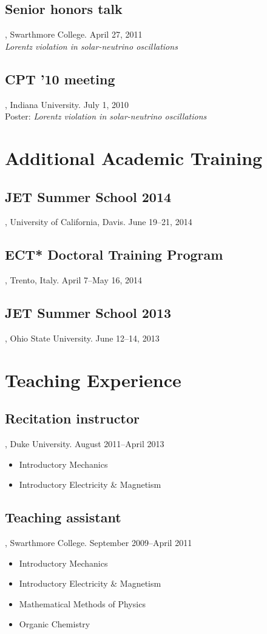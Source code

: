 \documentclass[letterpaper,10pt]{article}
\begin{document}
\subsection{Senior honors talk}, Swarthmore College. \hfill April 27, 2011 \\
\emph{Lorentz violation in solar-neutrino oscillations}

\subsection{CPT '10 meeting}, Indiana University. \hfill July 1, 2010 \\
Poster: \emph{Lorentz violation in solar-neutrino oscillations}



\section{Additional Academic Training}

\subsection{JET Summer School 2014}, University of California, Davis. \hfill June 19--21, 2014

\subsection{ECT* Doctoral Training Program}, Trento, Italy. \hfill April 7--May 16, 2014

\subsection{JET Summer School 2013}, Ohio State University. \hfill June 12--14, 2013



\section{Teaching Experience}

\subsection{Recitation instructor}, Duke University. \hfill August 2011--April 2013

\begin{itemize}
  \item Introductory Mechanics
  \item Introductory Electricity \& Magnetism
\end{itemize}


\subsection{Teaching assistant}, Swarthmore College. \hfill September 2009--April 2011

\begin{itemize}
  \item Introductory Mechanics
  \item Introductory Electricity \& Magnetism
  \item Mathematical Methods of Physics
  \item Organic Chemistry
\end{itemize}
\end{document}
